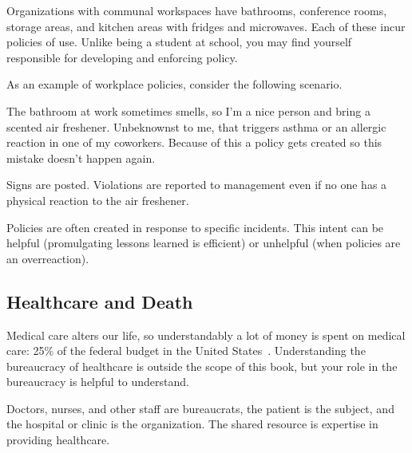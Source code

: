 

Organizations with communal workspaces have \iftoggle{glossarysubstitutionworks}{\glspl{shared resource}:}{shared resources:} bathrooms, conference rooms, storage areas, and kitchen areas with fridges and microwaves. Each of these incur policies of use. Unlike being a student at school, you may find yourself responsible for developing and enforcing policy. 

As an example of workplace policies, consider the following scenario. 
\begin{mdframed}[frametitle={The Bathroom Stinks},frametitlerule=true,frametitlealignment=\centering]
The bathroom at work sometimes smells, so I'm a nice person and bring a scented air freshener. Unbeknownst to me, that triggers asthma or an allergic reaction in one of my coworkers. Because of this a policy gets created so this mistake doesn't happen again. 

Signs are posted. Violations are reported to management even if no one has a physical reaction to the air freshener.
\end{mdframed}

Policies are often created in response to specific incidents. This intent can be helpful (promulgating lessons learned is efficient) or unhelpful (when policies are an overreaction). 

\subsection*{Healthcare and Death\label{sec:bureaucracy-of-death}}
Medical care alters our life, so understandably a lot of money is spent on medical care: 25\% of the federal budget in the United States~\cite{2023_cbpp}. Understanding the bureaucracy of healthcare is outside the scope of this book, but your role in the bureaucracy is helpful to understand.

Doctors, nurses, and other staff are bureaucrats, the patient is the subject, and the hospital or clinic is the organization. The shared resource is expertise in providing healthcare.

